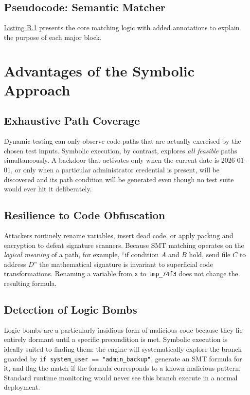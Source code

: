 \subsection{Pseudocode: Semantic Matcher}
 
\hyperref[lst:matcher]{Listing B.1} presents the core matching logic with added annotations to explain the purpose of each major block.
 
 
\section{Advantages of the Symbolic Approach}
 
\subsection{Exhaustive Path Coverage}
Dynamic testing can only observe code paths that are actually exercised by the chosen test inputs. Symbolic execution, by contrast, explores \textit{all feasible} paths simultaneously. A backdoor that activates only when the current date is 2026-01-01, or only when a particular administrator credential is present, will be discovered and its path condition will be generated even though no test suite would ever hit it deliberately.
 
\subsection{Resilience to Code Obfuscation}
Attackers routinely rename variables, insert dead code, or apply packing and encryption to defeat signature scanners. Because SMT matching operates on the \textit{logical meaning} of a path, for example, ``if condition $A$ and $B$ hold, send file $C$ to address $D$'' the mathematical signature is invariant to superficial code transformations. Renaming a variable from \texttt{x} to \texttt{tmp\_74f3} does not change the resulting formula.
 
\subsection{Detection of Logic Bombs}
Logic bombs are a particularly insidious form of malicious code because they lie entirely dormant until a specific precondition is met. Symbolic execution is ideally suited to finding them: the engine will systematically explore the branch guarded by \texttt{if system\_user == "admin\_backup"}, generate an SMT formula for it, and flag the match if the formula corresponds to a known malicious pattern. Standard runtime monitoring would never see this branch execute in a normal deployment.
 
